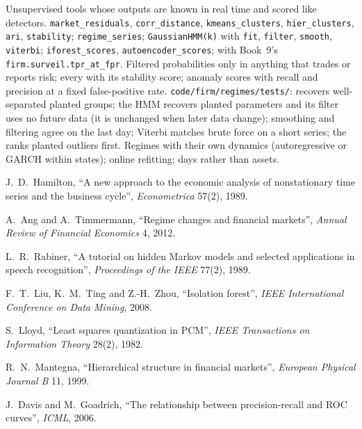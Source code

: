 \begin{build}
 Unsupervised tools whose outputs are known in real time and scored like detectors.
 \texttt{market\_residuals}, \texttt{corr\_distance}, \texttt{kmeans\_clusters}, \texttt{hier\_clusters},
\texttt{ari}, \texttt{stability}; \texttt{regime\_series}; \texttt{GaussianHMM(k)} with \texttt{fit}, \texttt{filter},
\texttt{smooth}, \texttt{viterbi}; \texttt{iforest\_scores}, \texttt{autoencoder\_scores}; with Book~9's
\texttt{firm.surveil.tpr\_at\_fpr}.
 Filtered probabilities only in anything that trades or reports risk; every  with its stability score;
anomaly scores with recall and precision at a fixed false-positive rate.
 \texttt{code/firm/regimes/tests/}:  recovers well-separated planted groups; the HMM recovers
planted parameters and its filter uses no future data (it is unchanged when later data change); smoothing and filtering agree
on the last day; Viterbi matches brute force on a short series; the  ranks planted outliers first.
 Regimes with their own dynamics (autoregressive or GARCH within states); online refitting;  days
rather than assets.
\end{build}

\begin{omsources}
\item J.~D.~Hamilton, ``A new approach to the economic analysis of nonstationary time series and the business cycle'',
\emph{Econometrica} 57(2), 1989.
\item A.~Ang and A.~Timmermann, ``Regime changes and financial markets'', \emph{Annual Review of Financial Economics} 4, 2012.
\item L.~R.~Rabiner, ``A tutorial on hidden Markov models and selected applications in speech recognition'',
\emph{Proceedings of the IEEE} 77(2), 1989.
\item F.~T.~Liu, K.~M.~Ting and Z.-H.~Zhou, ``Isolation forest'', \emph{IEEE International Conference on Data Mining}, 2008.
\item S.~Lloyd, ``Least squares quantization in PCM'', \emph{IEEE Transactions on Information Theory} 28(2), 1982.
\item R.~N.~Mantegna, ``Hierarchical structure in financial markets'', \emph{European Physical Journal B} 11, 1999.
\item J.~Davis and M.~Goadrich, ``The relationship between precision-recall and ROC curves'', \emph{ICML}, 2006.
\end{omsources}

